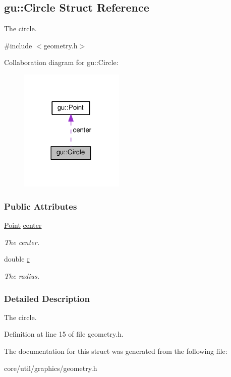 \hypertarget{structgu_1_1Circle}{}\subsection{gu\+:\+:Circle Struct Reference}
\label{structgu_1_1Circle}


The circle.  




{\ttfamily \#include $<$geometry.\+h$>$}



Collaboration diagram for gu\+:\+:Circle\+:\nopagebreak
\begin{figure}[H]
\begin{center}
\leavevmode
\includegraphics[width=141pt]{structgu_1_1Circle__coll__graph}
\end{center}
\end{figure}
\subsubsection*{Public Attributes}
\begin{DoxyCompactItemize}
\item 
\hyperlink{structgu_1_1Point}{Point} \hyperlink{structgu_1_1Circle_a41bdbe829d43620d6023b32bbd0dcc2a}{center}\hypertarget{structgu_1_1Circle_a41bdbe829d43620d6023b32bbd0dcc2a}{}\label{structgu_1_1Circle_a41bdbe829d43620d6023b32bbd0dcc2a}

\begin{DoxyCompactList}\small\item\em The center. \end{DoxyCompactList}\item 
double \hyperlink{structgu_1_1Circle_a2b66caf1a6054ee3ad9e34c5d718e74e}{r}\hypertarget{structgu_1_1Circle_a2b66caf1a6054ee3ad9e34c5d718e74e}{}\label{structgu_1_1Circle_a2b66caf1a6054ee3ad9e34c5d718e74e}

\begin{DoxyCompactList}\small\item\em The radius. \end{DoxyCompactList}\end{DoxyCompactItemize}


\subsubsection{Detailed Description}
The circle. 

Definition at line 15 of file geometry.\+h.



The documentation for this struct was generated from the following file\+:\begin{DoxyCompactItemize}
\item 
core/util/graphics/geometry.\+h\end{DoxyCompactItemize}
